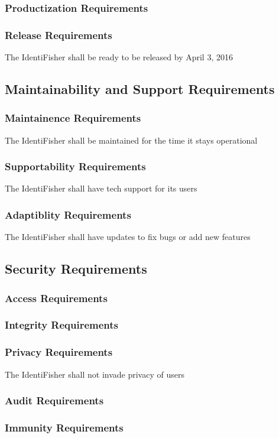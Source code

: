 \documentclass{article}
\begin{document}
\subsubsection{Productization Requirements}
\subsubsection{Release Requirements}
The IdentiFisher shall be ready to be released by April 3, 2016

\subsection{Maintainability and Support Requirements}
\subsubsection{Maintainence Requirements}
The IdentiFisher shall be maintained for the time it stays operational
\subsubsection{Supportability Requirements}
The IdentiFisher shall have tech support for its users
\subsubsection{Adaptiblity Requirements}
The IdentiFisher shall have updates to fix bugs or add new features

\subsection{Security Requirements}
\subsubsection{Access Requirements}
\subsubsection{Integrity Requirements}
\subsubsection{Privacy Requirements}
The IdentiFisher shall not invade privacy of users
\subsubsection{Audit Requirements}
\subsubsection{Immunity Requirements}
\end{document}
